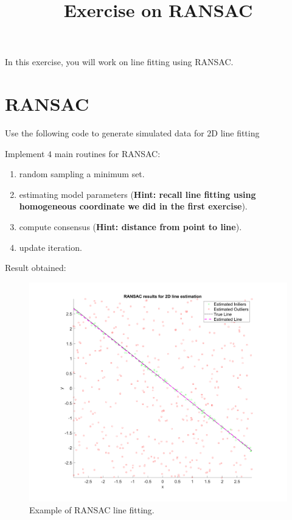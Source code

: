 \documentclass[a4paper]{article}
\begin{document}
\title{Exercise on RANSAC}
\maketitle%

In this exercise, you will work on line fitting using RANSAC.

\section{RANSAC}
Use the following code to generate simulated data for $2$D line fitting

Implement $4$ main routines for RANSAC: 
\begin{enumerate}
\item random sampling a minimum set.
\item estimating model parameters (\textbf{Hint: recall line fitting using homogeneous coordinate we did in the first exercise}).
\item compute consensus (\textbf{Hint: distance from point to line}).
\item update iteration.
\end{enumerate}
Result obtained:
\begin{figure}[!b]
\centering
\includegraphics[scale=0.5]{figures/ransac.png}
\caption{Example of RANSAC line fitting.}
\end{figure}

 
 

\end{document}
